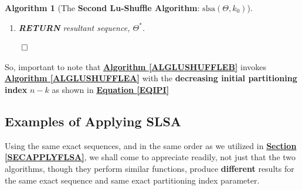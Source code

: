 \documentclass[a4paper, 18pt]{book} %
\newtheorem{alg}{Algorithm}
\begin{document}
\begin{alg}[The \textbf{Second Lu-Shuffle Algorithm}: $\text{slsa}(\Theta, k_0)$]
\begin{enumerate}
{\begin{enumerate}
	\item{\textbf{IF} $k$ is \textbf{ODD}: $(k \mod 2) = 1$:
		\begin{enumerate}
			\item \textbf{UPDATE} \textbf{resultant sequence}, $\Theta^* = \Theta_{rest} \cdot \Theta_{swap}$
		\end{enumerate}
	}
	\item{\textbf{ELSE IF} $k$ is \textbf{EVEN}: $(k \mod 2) = 0$:
		\begin{enumerate}
		\item \textbf{UPDATE} \textbf{resultant sequence}, $\Theta^* = \Theta_{swap} \cdot \Theta_{rest}$
		\end{enumerate}
	}
	
	\item \textbf{INCREMENT} $k$: $k = k + 1$
\end{enumerate}
}
\item \textbf{RETURN} resultant sequence, $\Theta^*$.
\end{enumerate}
$\qed$
\end{alg}

So, important to note that \textbf{\hyperref[ALGLUSHUFFLEB]{Algorithm \ref{ALGLUSHUFFLEB}}} invokes \textbf{\hyperref[ALGLUSHUFFLEA]{Algorithm \ref{ALGLUSHUFFLEA}}} with the \textbf{decreasing initial partitioning index} $n-k$ as shown in \textbf{\hyperref[EQIPI]{Equation \ref{EQIPI}}}



\subsection{Examples of Applying SLSA}
\label{SECAPPLYSLSA}



Using the same exact sequences, and in the same order as we utilized in \textbf{\hyperref[SECAPPLYFLSA]{Section \ref{SECAPPLYFLSA}}}, we shall come to appreciate readily, not just that the two algorithms, though they perform similar functions, produce \textbf{different} results for the same exact sequence and same exact partitioning index parameter.


\vspace{1em}
\\
\end{document}
